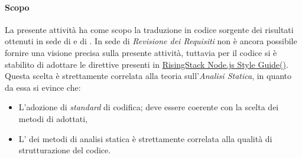                 \paragraph*{Scopo}
                La presente attivit\`a ha come scopo la traduzione in codice sorgente dei risultati ottenuti in sede
                di  e di .
                In sede di \textit{Revisione dei Requisiti} non \`e ancora possibile fornire una visione precisa sulla presente attivit\`a,
                tuttavia per il codice  
                si \`e stabilito di adottare le direttive presenti in \href{https://github.com/RisingStack/node-style-guide/blob/master/README.md}{RisingStack Node.js Style Guide()}.
                Questa scelta \`e strettamente correlata alla teoria sull'\textit{Analisi Statica}, in quanto da essa si evince che:
                \begin{itemize}
		  \item L’adozione di \textit{standard} di codifica;
                    deve essere coerente con la scelta dei metodi di  adottati,         
		  \item L’ dei metodi di analisi statica \`e strettamente correlata alla qualit\`a di strutturazione del codice.
                \end{itemize}

